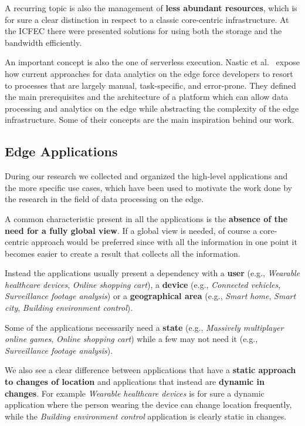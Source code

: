 A recurring topic is also the management of \textbf{less abundant resources}, which is for sure a clear distinction in respect to a classic core-centric infrastructure. At the ICFEC there were presented solutions for using both the storage \cite{efficient-edge-storage} and the bandwidth \cite{virtual-events-edge} efficiently.

An important concept is also the one of serverless execution. Nastic et al.~\cite{serverless-analytics-edge} expose how current approaches for data analytics on the edge force developers to resort to processes that are largely manual, task-specific, and error-prone. They defined the main prerequisites and the architecture of a platform which can allow data processing and analytics on the edge while abstracting the complexity of the edge infrastructure. Some of their concepts are the main inspiration behind our work.


\subsection{Edge Applications}

During our research we collected and organized the high-level applications and the more specific use cases, which have been used to motivate the work done by the research in the field of data processing on the edge.

A common characteristic present in all the applications is the \textbf{absence of the need for a fully global view}. If a global view is needed, of course a core-centric approach would be preferred since with all the information in one point it becomes easier to create a result that collects all the information.

Instead the applications usually present a dependency with a \textbf{user} (e.g., \textit{Wearable healthcare devices}, \textit{Online shopping cart}), a \textbf{device} (e.g., \textit{Connected vehicles}, \textit{Surveillance footage analysis}) or a \textbf{geographical area} (e.g., \textit{Smart home}, \textit{Smart city}, \textit{Building environment control}).

Some of the applications necessarily need a \textbf{state} (e.g., \textit{Massively multiplayer online games}, \textit{Online shopping cart}) while a few may not need it (e.g., \textit{Surveillance footage analysis}).

We also see a clear difference between applications that have a \textbf{static approach to changes of location} and applications that instead are \textbf{dynamic in changes}. For example \textit{Wearable healthcare devices} is for sure a dynamic application where the person wearing the device can change location frequently, while the \textit{Building environment control} application is clearly static in changes.


